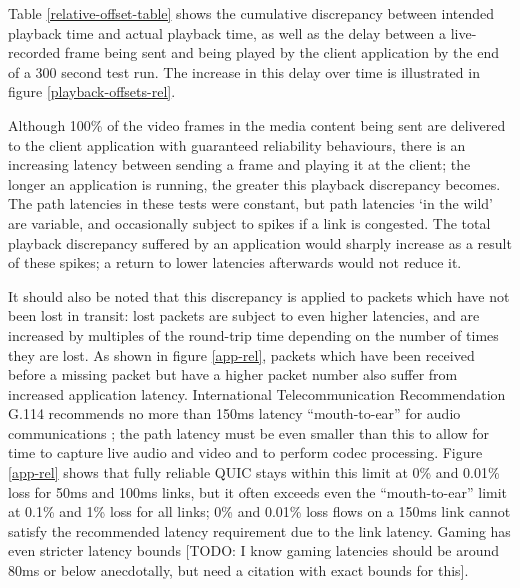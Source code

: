 \documentclass{mpaper}
\begin{document}
Table \ref{relative-offset-table} shows the cumulative discrepancy between intended playback time and actual playback time, as well as the delay between a live-recorded frame being sent and being played by the client application by the end of a 300 second test run. The increase in this delay over time is illustrated in figure \ref{playback-offsets-rel}.

Although 100\% of the video frames in the media content being sent are delivered to the client application with guaranteed reliability behaviours, there is an increasing latency between sending a frame and playing it at the client; the longer an application is running, the greater this playback discrepancy becomes. The path latencies in these tests were constant, but path latencies `in the wild' are variable, and occasionally subject to spikes if a link is congested. The total playback discrepancy suffered by an application would sharply increase as a result of these spikes; a return to lower latencies afterwards would not reduce it.

It should also be noted that this discrepancy is applied to packets which have not been lost in transit: lost packets are subject to even higher latencies, and are increased by multiples of the round-trip time depending on the number of times they are lost. As shown in figure \ref{app-rel}, packets which have been received before a missing packet but have a higher packet number also suffer from increased application latency. International Telecommunication Recommendation G.114 recommends no more than 150ms latency ``mouth-to-ear'' for audio communications \cite{ITU-REC}; the path latency must be even smaller than this to allow for time to capture live audio and video and to perform codec processing. Figure \ref{app-rel} shows that fully reliable QUIC stays within this limit at 0\% and 0.01\% loss for 50ms and 100ms links, but it often exceeds even the ``mouth-to-ear'' limit at 0.1\% and 1\% loss for all links; 0\% and 0.01\% loss flows on a 150ms link cannot satisfy the recommended latency requirement due to the link latency. Gaming has even stricter latency bounds [TODO: I know gaming latencies should be around 80ms or below anecdotally, but need a citation with exact bounds for this].
\end{document}
